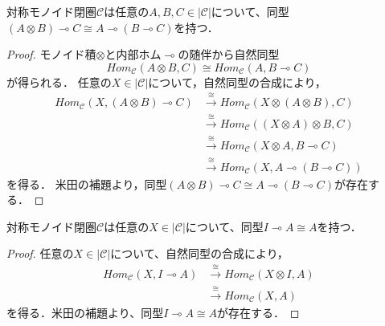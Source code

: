\documentclass[type_judgement.tex]{subfiles}
\begin{document}
\begin{prop}
\label{prop:mc_adj}
対称モノイド閉圏$\mathcal{C}$は任意の$A,B,C\in|\mathcal{C}|$について、同型$(A \otimes B) \multimap C \cong A \multimap (B \multimap C)$を持つ．
\end{prop}
\begin{proof}
モノイド積$\otimes$と内部ホム$\multimap$の随伴から自然同型
\begin{equation*}
    Hom_\mathcal{C}(A \otimes B, C) \cong Hom_\mathcal{C}(A, B \multimap C)
\end{equation*}
が得られる．
任意の$X\in|\mathcal{C}|$について，自然同型の合成により，
\begin{align*}
    Hom_\mathcal{C}(X, (A \otimes B) \multimap C) &\xrightarrow{\cong} Hom_\mathcal{C}(X \otimes (A \otimes B), C) \\
     &\xrightarrow{\cong} Hom_\mathcal{C}((X \otimes A) \otimes B, C) \\
     &\xrightarrow{\cong} Hom_\mathcal{C}(X \otimes A, B \multimap C) \\
     &\xrightarrow{\cong} Hom_\mathcal{C}(X, A \multimap (B \multimap C))
\end{align*}
を得る．
米田の補題より，同型$(A \otimes B) \multimap C \cong A \multimap (B \multimap C)$が存在する．
\end{proof}

\begin{prop}
\label{prop:unit}
対称モノイド閉圏$\mathcal{C}$は任意の$X\in|\mathcal{C}|$について、同型$I \multimap A \cong A$を持つ．
\end{prop}
\begin{proof}
任意の$X\in|\mathcal{C}|$について、自然同型の合成により，
\begin{align*}
    Hom_\mathcal{C}(X, I \multimap A) &\xrightarrow{\cong} Hom_\mathcal{C}(X \otimes I, A) \\
    &\xrightarrow{\cong} Hom_\mathcal{C}(X, A)
\end{align*}
を得る．米田の補題より、同型$I \multimap A \cong A$が存在する．
\end{proof}
\end{document}
